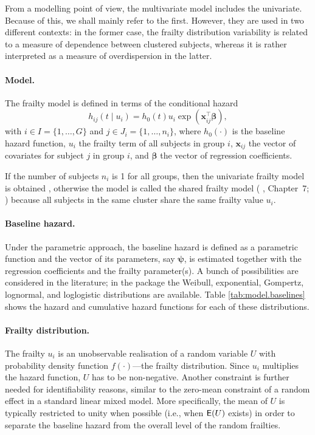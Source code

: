 From a modelling point of view, the multivariate model includes the univariate.
Because of this, we shall mainly refer to the first.
However, they are used in two different contexts: 
	in the former case, the frailty distribution variability is related to a measure of dependence between clustered subjects,
	whereas it is rather interpreted as a measure of overdispersion in the latter.

\paragraph{Model.}
The frailty model is defined in terms of the conditional hazard 
\begin{equation*}
  h_{ij}(t \mid u_i) = h_0(t) u_i \exp{(\bm{x}_{ij}^\top \bm\beta)},
\end{equation*}
with  $i \in I = \{ 1, \ldots, G \}$ and $j \in J_{i} = \{ 1, \ldots, n_i \}$, where
      $h_0( \cdot )$ is the baseline hazard function,
      $u_i$ the frailty term of all subjects in group $i$,
      $\bm{x}_{ij}$ the vector of covariates for subject $j$ in group $i$, and
      $\bm\beta$ the vector of regression coefficients.

If the number of subjects $n_i$ is 1 for all groups, then the univariate frailty model is obtained
  \cite[Chapter~3]{Wienke10},
otherwise the model is called the {shared} frailty model (\citeauthor{Hougaard00} \citeyear{Hougaard00}, Chapter~7; \citeauthor{DuchateauJanssen08} \citeyear{DuchateauJanssen08})
  because all subjects in the same cluster share the same frailty value $u_i$.

    
\paragraph{Baseline hazard.}
Under the parametric approach, the baseline hazard is defined as a parametric 
  function and the vector of its parameters, say $\bm{\psi}$, 
  is estimated together with the regression coefficients and the frailty parameter(s).
A bunch of possibilities are considered in the literature;
in the  package the
  Weibull,
  exponential,
  Gompertz,
  lognormal, and
  loglogistic
  distributions are available.
Table \ref{tab:model.baselines} shows the hazard and cumulative hazard functions for each of these distributions.
  
  
  
  
\paragraph{Frailty distribution.}
The frailty $u_i$ is an unobservable realisation of a random variable $U$ 
  with probability density function $f(\cdot)$---the frailty distribution.
Since $u_i$ multiplies the hazard function, $U$ has to be non-negative. 
Another constraint is further needed for identifiability reasons, 
  similar to the zero-mean constraint of a random effect in a standard linear mixed model.
More specifically, the mean of $U$ is typically restricted to unity when possible (i.e., when $\mathsf{E}(U)$ exists)
in order to separate the baseline hazard from the overall level of the random frailties.



